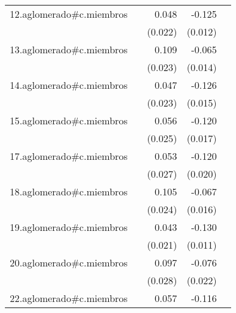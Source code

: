 {\begin{longtable}{l*{4}{D{.}{.}{-1}}}
\addlinespace
12.aglomerado#c.miembros&                     &       0.048\sym{*}  &      -0.125\sym{***}&                     \\
            &                     &     (0.022)         &     (0.012)         &                     \\
\addlinespace
13.aglomerado#c.miembros&                     &       0.109\sym{***}&      -0.065\sym{***}&                     \\
            &                     &     (0.023)         &     (0.014)         &                     \\
\addlinespace
14.aglomerado#c.miembros&                     &       0.047\sym{*}  &      -0.126\sym{***}&                     \\
            &                     &     (0.023)         &     (0.015)         &                     \\
\addlinespace
15.aglomerado#c.miembros&                     &       0.056\sym{*}  &      -0.120\sym{***}&                     \\
            &                     &     (0.025)         &     (0.017)         &                     \\
\addlinespace
17.aglomerado#c.miembros&                     &       0.053\sym{*}  &      -0.120\sym{***}&                     \\
            &                     &     (0.027)         &     (0.020)         &                     \\
\addlinespace
18.aglomerado#c.miembros&                     &       0.105\sym{***}&      -0.067\sym{***}&                     \\
            &                     &     (0.024)         &     (0.016)         &                     \\
\addlinespace
19.aglomerado#c.miembros&                     &       0.043\sym{*}  &      -0.130\sym{***}&                     \\
            &                     &     (0.021)         &     (0.011)         &                     \\
\addlinespace
20.aglomerado#c.miembros&                     &       0.097\sym{***}&      -0.076\sym{***}&                     \\
            &                     &     (0.028)         &     (0.022)         &                     \\
\addlinespace
22.aglomerado#c.miembros&                     &       0.057\sym{**} &      -0.116\sym{***}&                     \\

\end{longtable}}
